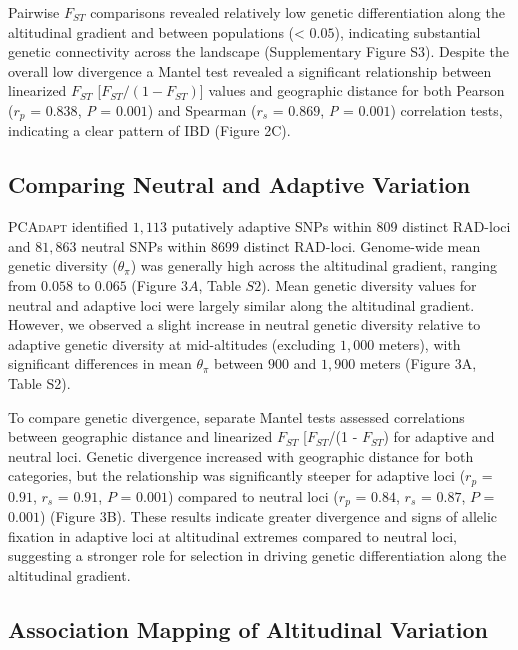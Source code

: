 \documentclass[9pt,a4paper,twoside]{rho-class/rho}
\begin{document}
        Pairwise $F_{ST}$ comparisons revealed relatively low genetic differentiation along the altitudinal gradient and between populations (< $0.05$), indicating substantial genetic connectivity across the landscape (Supplementary Figure S3). Despite the overall low divergence a Mantel test revealed a significant relationship between linearized $F_{ST}$  [$F_{ST}/(1 - F_{ST})$] values and geographic distance for both Pearson (\textit{$r_p$} = $0.838$, \textit{P} = $0.001$) and Spearman (\textit{$r_s$} = $0.869$, \textit{P} = $0.001$) correlation tests, indicating a clear pattern of IBD (Figure 2C).

    \subsection{Comparing Neutral and Adaptive Variation}

        \textsc{PCAdapt} identified $1,113$ putatively adaptive SNPs within 809 distinct RAD-loci and $81,863$ neutral SNPs within 8699 distinct RAD-loci. Genome-wide mean genetic diversity ($\theta_\pi$) was generally high across the altitudinal gradient, ranging from $0.058$ to $0.065$ (Figure $3A$, Table $S2$). Mean genetic diversity values for neutral and adaptive loci were largely similar along the altitudinal gradient. However, we observed a slight increase in neutral genetic diversity relative to adaptive genetic diversity at mid-altitudes (excluding $1,000$ meters), with significant differences in mean $\theta_\pi$ between $900$ and $1,900$ meters (Figure 3A, Table S2).
    
        To compare genetic divergence, separate Mantel tests assessed correlations between geographic distance and linearized $F_{ST}$ [$F_{ST}$/(1 - $F_{ST}$) for adaptive and neutral loci. Genetic divergence increased with geographic distance for both categories, but the relationship was significantly steeper for adaptive loci (\textit{$r_p$} = $0.91$, \textit{$r_s$} = $0.91$, \textit{$P$} = $0.001$) compared to neutral loci (\textit{$r_p$} = $0.84$, \textit{$r_s$} = $0.87$, \textit{$P$} = $0.001$) (Figure 3B). These results indicate greater divergence and signs of allelic fixation in adaptive loci at altitudinal extremes compared to neutral loci, suggesting a stronger role for selection in driving genetic differentiation along the altitudinal gradient.

    \subsection{Association Mapping of Altitudinal Variation}
\end{document}
